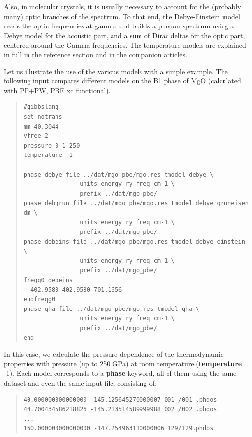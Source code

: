 \documentclass[a4paper]{article}
\begin{document}
Also, in molecular crystals, it is usually necessary to account for
the (probably many) optic branches of the spectrum. To that end, the
Debye-Einstein model reads the optic frequencies at gamma and builds a
phonon spectrum using a Debye model for the acoustic part, and a sum
of Dirac deltas for the optic part, centered around the Gamma
frequencies. The temperature models are explained in full in the
reference section and in the companion articles.

Let us illustrate the use of the various models with a simple
example. The following input compares different models on the B1 phase
of MgO (calculated with PP+PW, PBE xc functional).
%
\begin{quote}
\begin{verbatim}
#gibbslang
set notrans
mm 40.3044
vfree 2
pressure 0 1 250
temperature -1

phase debye file ../dat/mgo_pbe/mgo.res tmodel debye \
                units energy ry freq cm-1 \
                prefix ../dat/mgo_pbe/
phase debgrun file ../dat/mgo_pbe/mgo.res tmodel debye_gruneisen dm \
                units energy ry freq cm-1 \
                prefix ../dat/mgo_pbe/
phase debeins file ../dat/mgo_pbe/mgo.res tmodel debye_einstein \
                units energy ry freq cm-1 \
                prefix ../dat/mgo_pbe/
freqg0 debeins
  402.9580 402.9580 701.1656
endfreqg0
phase qha file ../dat/mgo_pbe/mgo.res tmodel qha \
                units energy ry freq cm-1 \
                prefix ../dat/mgo_pbe/
end
\end{verbatim}
\end{quote}

In this case, we calculate the pressure dependence of the
thermodynamic properties with pressure (up to 250 GPa) at room
temperature (\textbf{temperature} -1). Each model corresponds to a
\textbf{phase} keyword, all of them using the same dataset and even the
same input file, consisting of:
%
\begin{quote}
\begin{verbatim}
40.000000000000000 -145.125645270000007 001_/001_.phdos
40.700434586218826 -145.213514589999988 002_/002_.phdos
...
160.000000000000000 -147.254963110000006 129/129.phdos
\end{verbatim}
\end{quote}
\end{document}
